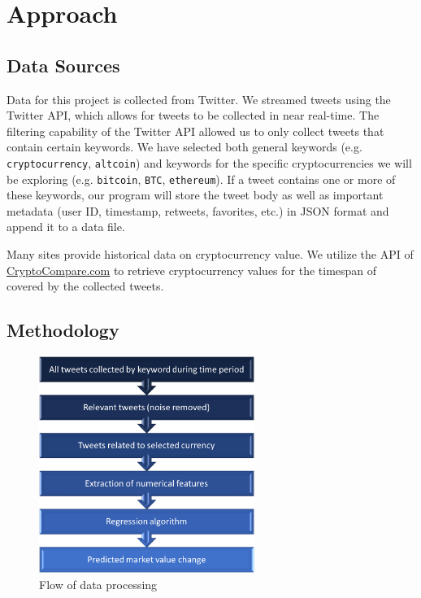 \documentclass[sigconf]{acmart}
\newcommand{\code}{\texttt}
\begin{document}
\section{Approach}

\subsection{Data Sources}
Data for this project is collected from Twitter. We streamed tweets  using the Twitter API, which allows for tweets to be collected in near real-time. The filtering capability of the Twitter API allowed us to only collect tweets that contain certain keywords. We have selected both general keywords (e.g. \code{cryptocurrency}, \code{altcoin}) and keywords for the specific cryptocurrencies we will be exploring (e.g. \code{bitcoin}, \code{BTC}, \code{ethereum}). If a tweet contains one or more of these keywords, our program will store the tweet body as well as important metadata (user ID, timestamp, retweets, favorites, etc.) in JSON format and append it to a data file.

Many sites provide historical data on cryptocurrency value. We utilize the API of \href{https://www.cryptocompare.com}{CryptoCompare.com} to retrieve cryptocurrency values for the timespan of covered by the collected tweets.

\subsection{Methodology}

\begin{figure}[H]
\caption{Flow of data processing}
\includegraphics[width=7cm]{chart.png}
\end{figure}
\end{document}
